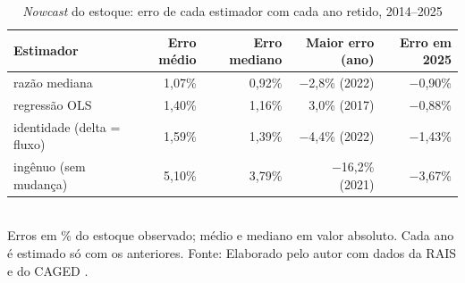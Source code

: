 \begin{table}[htbp]
    \centering
    \caption{\textit{Nowcast} do estoque: erro de cada estimador com cada ano retido, 2014--2025}
    \label{tab:nowcast}
    \footnotesize
    \renewcommand{\arraystretch}{1.25}
    \begin{tabular}{lrrrr}
        \toprule
        \rowcolor{black!8}
        \textbf{Estimador} & \textbf{Erro médio} & \textbf{Erro mediano} & \textbf{Maior erro (ano)} & \textbf{Erro em 2025} \\
        \midrule
        razão mediana & 1,07\% & 0,92\% & $-$2,8\% (2022) & $-$0,90\% \\
        regressão OLS & 1,40\% & 1,16\% & 3,0\% (2017) & $-$0,88\% \\
        identidade (delta = fluxo) & 1,59\% & 1,39\% & $-$4,4\% (2022) & $-$1,43\% \\
        ingênuo (sem mudança) & 5,10\% & 3,79\% & $-$16,2\% (2021) & $-$3,67\% \\
        \bottomrule
    \end{tabular}
    \\[4pt]
    Erros em \% do estoque observado; médio e mediano em valor absoluto. Cada ano é estimado só com os anteriores. Fonte: Elaborado pelo autor com dados da RAIS e do CAGED \cite{RAIS2024, CAGED2024}.
\end{table}
